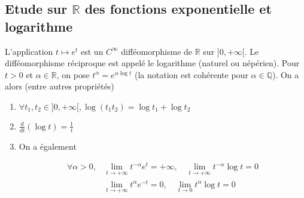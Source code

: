 \subsection{Etude sur $\mathbb{R}$ des fonctions exponentielle et logarithme}

\begin{thm}
L'application $t \mapsto e^t$ est un $C^\infty$ difféomorphisme de $\mathbb{R}$ sur $]0,+\infty[$. Le difféomorphisme réciproque est appelé le logarithme (naturel ou népérien). Pour $t > 0$ et $\alpha \in \mathbb{R}$, on pose $t^\alpha = e^{\alpha \log t}$ (la notation est cohérente pour $\alpha \in \mathbb{Q}$). On a alors (entre autres propriétés)

\begin{enumerate}
\item $\forall t_1, t_2 \in ]0,+\infty[, \log(t_1 t_2) = \log t_1 + \log t_2$
\item $\frac{d}{dt}(\log t) = \frac{1}{t}$
\item On a également

\begin{align*}
\forall \alpha > 0, & \lim_{t \rightarrow +\infty} t^{-\alpha} e^t = +\infty, \quad \lim_{t \rightarrow +\infty} t^{-\alpha} \log t = 0 \\
& \lim_{t \rightarrow +\infty} t^\alpha e^{-t} = 0, \quad \lim_{t \rightarrow 0} t^\alpha \log t = 0
\end{align*}
\end{enumerate}
\end{thm}

